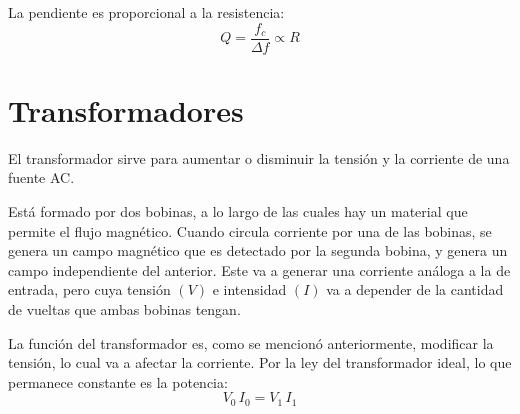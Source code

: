\documentclass[a5paper,12pt,twoside]{book}
\begin{document}
La pendiente es proporcional a la resistencia:
\begin{equation*}
    Q = \frac{f_c}{\Delta f} \propto R
\end{equation*}


\section{Transformadores}

El transformador sirve para aumentar o disminuir la tensión y la corriente de una fuente AC.

Está formado por dos bobinas, a lo largo de las cuales hay un material que permite el flujo magnético. Cuando circula corriente por una de las bobinas, se genera un campo magnético que es detectado por la segunda bobina, y genera un campo independiente del anterior. Este va a generar una corriente análoga a la de entrada, pero cuya tensión $(V)$ e intensidad $(I)$ va a depender de la cantidad de vueltas que ambas bobinas tengan.

\begin{center}
    \def\svgwidth{\linewidth}
    
\end{center}

La función del transformador es, como se mencionó anteriormente, modificar la tensión, lo cual va a afectar la corriente. Por la ley del transformador ideal, lo que permanece constante es la potencia:
\begin{equation*}
    V_0 \, I_0 = V_1 \, I_1
\end{equation*}
\end{document}
